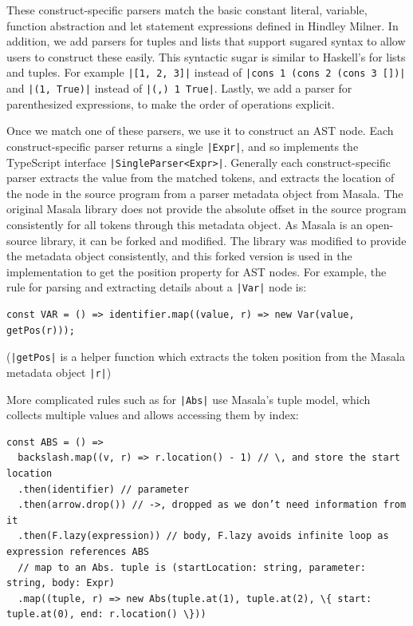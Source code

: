 \documentclass[a4paper,fleqn,twoside,12pt]{report}
\begin{document}
These construct-specific parsers match the basic constant literal, variable, function abstraction and let statement expressions defined in Hindley Milner. In addition, we add parsers for tuples and lists that support sugared syntax to allow users to construct these easily. This syntactic sugar is similar to Haskell’s for lists and tuples. For example \texttt{|[1, 2, 3]|} instead of  \texttt{|cons 1 (cons 2 (cons 3 [])|} and \texttt{|(1, True)|} instead of \texttt{|(,) 1 True|}. Lastly, we add a parser for parenthesized expressions, to make the order of operations explicit.

Once we match one of these parsers, we use it to construct an AST node. Each construct-specific parser returns a single \texttt{|Expr|}, and so implements the TypeScript interface \texttt{|SingleParser<Expr>|}. Generally each construct-specific parser extracts the value from the matched tokens, and extracts the location of the node in the source program from a parser metadata object from Masala. The original Masala library does not provide the absolute offset in the source program consistently for all tokens through this metadata object. As Masala is an open-source library, it can be forked and modified. The library was modified to provide the metadata object consistently, and this forked version is used in the implementation to get the position property for AST nodes. For example, the rule for parsing and extracting details about a \texttt{|Var|} node is:

\begin{verbatim}
const VAR = () => identifier.map((value, r) => new Var(value, getPos(r)));
\end{verbatim}

(\texttt{|getPos|} is a helper function which extracts the token position from the Masala metadata object \texttt{|r|})

More complicated rules such as for \texttt{|Abs|} use Masala’s tuple model, which collects multiple values and allows accessing them by index:

\begin{verbatim}
const ABS = () =>
  backslash.map((v, r) => r.location() - 1) // \, and store the start location
  .then(identifier) // parameter
  .then(arrow.drop()) // ->, dropped as we don’t need information from it
  .then(F.lazy(expression)) // body, F.lazy avoids infinite loop as expression references ABS
  // map to an Abs. tuple is (startLocation: string, parameter: string, body: Expr)
  .map((tuple, r) => new Abs(tuple.at(1), tuple.at(2), \{ start: tuple.at(0), end: r.location() \}))
\end{verbatim}
\end{document}
